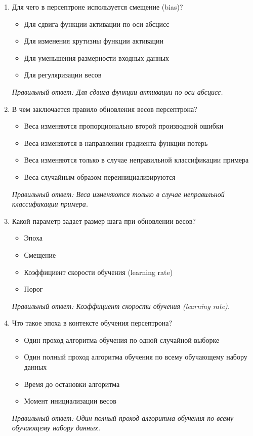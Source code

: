 \begin{enumerate}[label=\textbf{\arabic*.}, leftmargin=0pt, itemsep=1.2em]
\item Для чего в персептроне используется смещение (bias)?
\begin{itemize}[label=$\square$, leftmargin=1.5cm, itemsep=0.2em, topsep=0.3em]
\item Для сдвига функции активации по оси абсцисс
\item Для изменения крутизны функции активации
\item Для уменьшения размерности входных данных
\item Для регуляризации весов
\end{itemize}
{\small\textit{Правильный ответ: Для сдвига функции активации по оси абсцисс.}}

\item В чем заключается правило обновления весов персептрона?
\begin{itemize}[label=$\square$, leftmargin=1.5cm, itemsep=0.2em, topsep=0.3em]
\item Веса изменяются пропорционально второй производной ошибки
\item Веса изменяются в направлении градиента функции потерь
\item Веса изменяются только в случае неправильной классификации примера
\item Веса случайным образом переинициализируются
\end{itemize}
{\small\textit{Правильный ответ: Веса изменяются только в случае неправильной классификации примера.}}

\item Какой параметр задает размер шага при обновлении весов?
\begin{itemize}[label=$\square$, leftmargin=1.5cm, itemsep=0.2em, topsep=0.3em]
\item Эпоха
\item Смещение
\item Коэффициент скорости обучения (learning rate)
\item Порог
\end{itemize}
{\small\textit{Правильный ответ: Коэффициент скорости обучения (learning rate).}}

\item Что такое эпоха в контексте обучения персептрона?
\begin{itemize}[label=$\square$, leftmargin=1.5cm, itemsep=0.2em, topsep=0.3em]
\item Один проход алгоритма обучения по одной случайной выборке
\item Один полный проход алгоритма обучения по всему обучающему набору данных
\item Время до остановки алгоритма
\item Момент инициализации весов
\end{itemize}
{\small\textit{Правильный ответ: Один полный проход алгоритма обучения по всему обучающему набору данных.}}


\end{enumerate}
